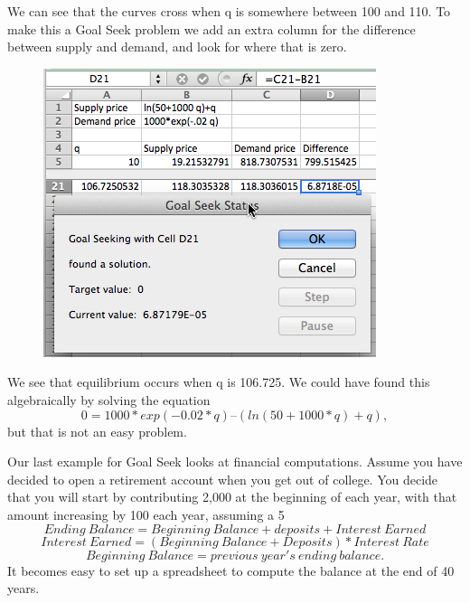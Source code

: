 \documentclass[10pt,]{book}
\theoremstyle{plain}
\theoremstyle{definition}
\theoremstyle{definition}
\begin{document}
%
\par

We can see that the curves cross when q is somewhere between 100 and 110.  To make this a Goal Seek problem we add an extra column for the difference between supply and demand, and look for where that is zero.
 
  \leavevmode%
\begin{figure}
\centering
\includegraphics[width=0.8\linewidth]{images/sec1-6-7.png}
\end{figure}
 

%
\par

We see that equilibrium occurs when q is 106.725.  We could have found this algebraically by solving the equation
\begin{equation*}0 = 1000*exp(-0.02*q) – (ln(50 + 1000*q) + q),\end{equation*}
but that is not an easy problem.%
\par
Our last example for Goal Seek looks at financial computations.  Assume you have decided to open a retirement account when you get out of college.  You decide that you will start by contributing \textdollar{}2,000 at the beginning of each year, with that amount increasing by \textdollar{}100 each year, assuming a 5%
\begin{equation*}Ending\ Balance = Beginning\ Balance + deposits + Interest\ Earned\end{equation*}
\begin{equation*}Interest\ Earned = (Beginning\ Balance + Deposits) * Interest\ Rate\end{equation*}
\begin{equation*}Beginning\ Balance = previous\ year's\ ending\ balance.\end{equation*}
It becomes easy to set up a spreadsheet to compute the balance at the end of 40 years.
\end{document}
